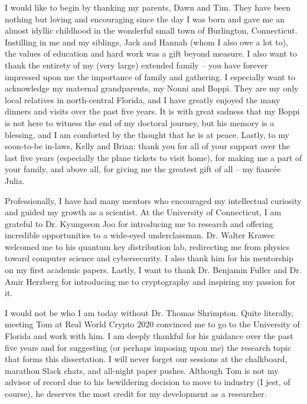 I would like to begin by thanking my parents, Dawn and Tim. They have been nothing but loving and encouraging since the day I was born and gave me an almost idyllic childhood in the wonderful small town of Burlington, Connecticut. Instilling in me and my siblings, Jack and Hannah (whom I also owe a lot to), the values of education and hard work was a gift beyond measure. I also want to thank the entirety of my (very large) extended family -- you have forever impressed upon me the importance of family and gathering. I especially want to acknowledge my maternal grandparents, my Nonni and Boppi. They are my only local relatives in north-central Florida, and I have greatly enjoyed the many dinners and visits over the past five years. It is with great sadness that my Boppi is not here to witness the end of my doctoral journey, but his memory is a blessing, and I am comforted by the thought that he is at peace. Lastly, to my soon-to-be in-laws, Kelly and Brian: thank you for all of your support over the last five years (especially the plane tickets to visit home), for making me a part of your family, and above all, for giving me the greatest gift of all -- my fiancée Julia.

Professionally, I have had many mentors who encouraged my intellectual curiosity and guided my growth as a scientist. At the University of Connecticut, I am grateful to Dr. Kyungseon Joo for introducing me to research and offering incredible opportunities to a wide-eyed underclassman. Dr. Walter Krawec welcomed me to his quantum key distribution lab, redirecting me from physics toward computer science and cybersecurity. I also thank him for his mentorship on my first academic papers. Lastly, I want to thank Dr. Benjamin Fuller and Dr. Amir Herzberg for introducing me to cryptography and inspiring my passion for it.

I would not be who I am today without Dr. Thomas Shrimpton. Quite literally, meeting Tom at Real World Crypto 2020 convinced me to go to the University of Florida and work with him. I am deeply thankful for his guidance over the past five years and for suggesting (or perhaps imposing upon me) the research topic that forms this dissertation. I will never forget our sessions at the chalkboard, marathon Slack chats, and all-night paper pushes. Although Tom is not my advisor of record due to his bewildering decision to move to industry (I jest, of course), he deserves the most credit for my development as a researcher.

